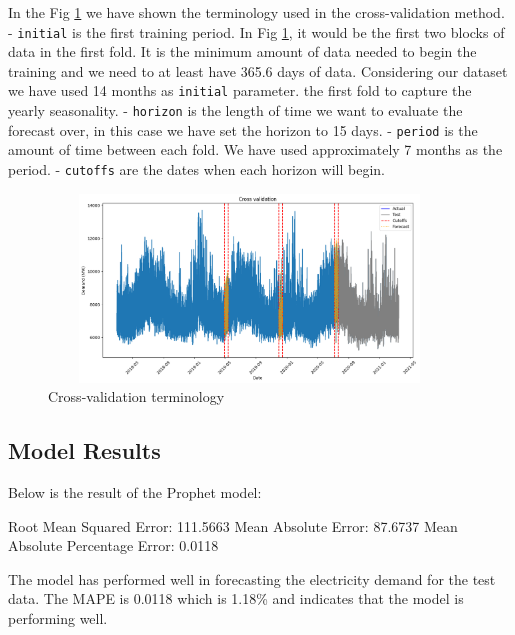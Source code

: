 \documentclass[mstat,12pt]{unswthesis}
\newenvironment{Shaded}{\begin{snugshade}}{\end{snugshade}}
\newcommand{\FloatTok}[1]{\textcolor[rgb]{0.00,0.00,0.81}{#1}}
\newcommand{\NormalTok}[1]{#1}
\begin{document}
In the Fig \ref{cross_validation_output} we have shown the terminology
used in the cross-validation method. - \texttt{initial} is the first
training period. In Fig \ref{cross_validation_output}, it would be the
first two blocks of data in the first fold. It is the minimum amount of
data needed to begin the training and we need to at least have 365.6
days of data. Considering our dataset we have used 14 months as
\texttt{initial} parameter. the first fold to capture the yearly
seasonality. - \texttt{horizon} is the length of time we want to
evaluate the forecast over, in this case we have set the horizon to 15
days. - \texttt{period} is the amount of time between each fold. We have
used approximately 7 months as the period. - \texttt{cutoffs} are the
dates when each horizon will begin.

\begin{figure}[H]
\centering
\includegraphics[width=0.95\textwidth, height=5cm]{cutoff_crossvalidation.png}
\caption{Cross-validation terminology}\label{cross_validation_output}
\end{figure}

\hypertarget{model-results}{%
\subsection{Model Results}\label{model-results}}

Below is the result of the Prophet model:

\begin{Shaded}
\begin{Highlighting}[]
\NormalTok{Root Mean Squared Error: }\FloatTok{111.5663}
\NormalTok{Mean Absolute Error: }\FloatTok{87.6737}
\NormalTok{Mean Absolute Percentage Error: }\FloatTok{0.0118}
\end{Highlighting}
\end{Shaded}

The model has performed well in forecasting the electricity demand for
the test data. The MAPE is 0.0118 which is 1.18\% and indicates that the
model is performing well.
\end{document}
